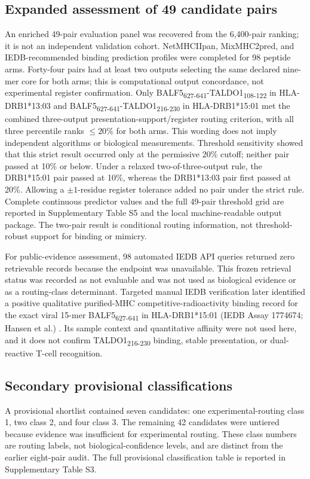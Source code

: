 \documentclass[11pt]{article}
\newcommand{\pep}[2]{#1\textsubscript{#2}}
\begin{document}
\subsection{Expanded assessment of 49 candidate pairs}
An enriched 49-pair evaluation panel was recovered from the 6,400-pair ranking; it is not an independent validation cohort. NetMHCIIpan, MixMHC2pred, and IEDB-recommended binding prediction profiles were completed for 98 peptide arms. Forty-four pairs had at least two outputs selecting the same declared nine-mer core for both arms; this is computational output concordance, not experimental register confirmation. Only \pep{BALF5}{627-641}-\pep{TALDO1}{108-122} in HLA-DRB1*13:03 and \pep{BALF5}{627-641}-\pep{TALDO1}{216-230} in HLA-DRB1*15:01 met the combined three-output presentation-support/register routing criterion, with all three percentile ranks $\leq20\%$ for both arms. This wording does not imply independent algorithms or biological measurements. Threshold sensitivity showed that this strict result occurred only at the permissive 20\% cutoff; neither pair passed at 10\% or below. Under a relaxed two-of-three-output rule, the DRB1*15:01 pair passed at 10\%, whereas the DRB1*13:03 pair first passed at 20\%. Allowing a $\pm1$-residue register tolerance added no pair under the strict rule. Complete continuous predictor values and the full 49-pair threshold grid are reported in Supplementary Table S5 and the local machine-readable output package. The two-pair result is conditional routing information, not threshold-robust support for binding or mimicry.

For public-evidence assessment, 98 automated IEDB API queries returned zero retrievable records because the endpoint was unavailable. This frozen retrieval status was recorded as not evaluable and was not used as biological evidence or as a routing-class determinant. Targeted manual IEDB verification later identified a positive qualitative purified-MHC competitive-radioactivity binding record for the exact viral 15-mer \pep{BALF5}{627-641} in HLA-DRB1*15:01 (IEDB Assay 1774674; Hansen et al.) \cite{iedb,hansen}. Its sample context and quantitative affinity were not used here, and it does not confirm TALDO1\textsubscript{216-230} binding, stable presentation, or dual-reactive T-cell recognition.

\subsection{Secondary provisional classifications}
A provisional shortlist contained seven candidates: one experimental-routing class 1, two class 2, and four class 3. The remaining 42 candidates were untiered because evidence was insufficient for experimental routing. These class numbers are routing labels, not biological-confidence levels, and are distinct from the earlier eight-pair audit.
The full provisional classification table is reported in Supplementary Table S3.
\end{document}
